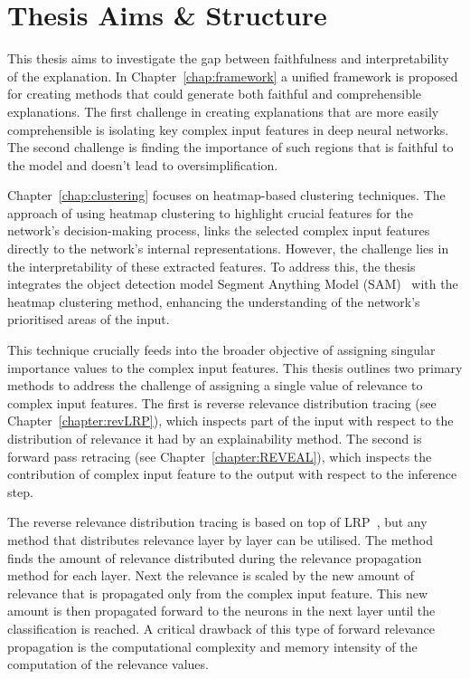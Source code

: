 \section{Thesis Aims \& Structure}

This thesis aims to investigate the gap between faithfulness and interpretability of the explanation. In Chapter~\ref{chap:framework} a unified framework is proposed for creating methods that could generate both faithful and comprehensible explanations. The first challenge in creating explanations that are more easily comprehensible is isolating key complex input features in deep neural networks. The second challenge is finding the importance of such regions that is faithful to the model and doesn't lead to oversimplification. 

Chapter~\ref{chap:clustering} focuses on heatmap-based clustering techniques. The approach of using heatmap clustering to highlight crucial features for the network's decision-making process, links the selected complex input features directly to the network's internal representations. However, the challenge lies in the interpretability of these extracted features. To address this, the thesis integrates the object detection model Segment Anything Model (SAM)~\cite{kirillov2023segment} with the heatmap clustering method, enhancing the understanding of the network's prioritised areas of the input. 

This technique crucially feeds into the broader objective of assigning singular importance values to the complex input features. This thesis outlines two primary methods to address the challenge of assigning a single value of relevance to complex input features. The first is reverse relevance distribution tracing (see Chapter~\ref{chapter:revLRP}), which inspects part of the input with respect to the distribution of relevance it had by an explainability method. The second is forward pass retracing (see Chapter~\ref{chapter:REVEAL}), which inspects the contribution of complex input feature to the output with respect to the inference step. 

The reverse relevance distribution tracing is based on top of LRP~\cite{bach2015pixel}, but any method that distributes relevance layer by layer can be utilised. The method finds the amount of relevance distributed during the relevance propagation method for each layer. Next the relevance is scaled by the new amount of relevance that is propagated only from the complex input feature. This new amount is then propagated forward to the neurons in the next layer until the classification is reached. A critical drawback of  this type of forward relevance propagation is the computational complexity and memory intensity of the computation of the relevance values. 

